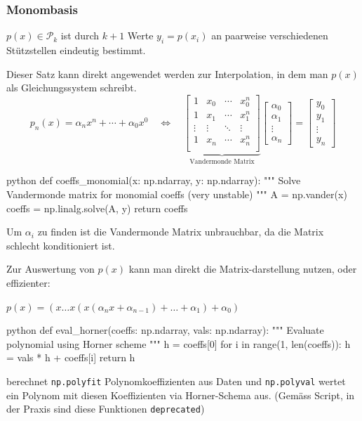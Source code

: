 \subsubsection{Monombasis}

 $p(x) \in \mathcal{P}_k$ ist durch $k+1$ Werte $y_i = p(x_i)$ an paarweise verschiedenen Stützstellen eindeutig bestimmt.

Dieser Satz kann direkt angewendet werden zur Interpolation, in dem man $p(x)$ als Gleichungssystem schreibt.
$$
	p_n(x) = \alpha_n x^n + \cdots + \alpha_0 x^0 \quad \iff \quad
	\underbrace{
		\begin{bmatrix}
			1      & x_0    & \cdots & x_0^n  \\
			1      & x_1    & \cdots & x_1^n  \\
			\vdots & \vdots & \ddots & \vdots \\
			1      & x_n    & \cdots & x_n^n  \\
		\end{bmatrix}
	}_\text{Vandermonde Matrix}
	\begin{bmatrix}
		\alpha_0 \\
		\alpha_1 \\
		\vdots   \\
		\alpha_n
	\end{bmatrix}
	=
	\begin{bmatrix}
		y_0    \\
		y_1    \\
		\vdots \\
		y_n
	\end{bmatrix}
$$

\begin{code}{python}
def coeffs_monomial(x: np.ndarray, y: np.ndarray):
    """ Solve Vandermonde matrix for monomial coeffs (very unstable) """
    A = np.vander(x)
    coeffs = np.linalg.solve(A, y)
    return coeffs
\end{code}

Um $\alpha_i$ zu finden ist die Vandermonde Matrix unbrauchbar, da die Matrix schlecht konditioniert ist.

\newpage

Zur Auswertung von $p(x)$ kann man direkt die Matrix-darstellung nutzen, oder effizienter:

 $p(x) = (x \ldots x ( x (\alpha_n x + \alpha_{n-1}) + \ldots + \alpha_1) + \alpha_0)$

\begin{code}{python}
def eval_horner(coeffs: np.ndarray, vals: np.ndarray):
    """ Evaluate polynomial using Horner scheme """
    h = coeffs[0]
    for i in range(1, len(coeffs)): h = vals * h + coeffs[i]
    return h
\end{code}

\innumpy berechnet \verb|np.polyfit| Polynomkoeffizienten aus Daten und \verb|np.polyval| wertet ein Polynom mit diesen Koeffizienten via Horner-Schema aus. (Gemäss Script, in der Praxis sind diese Funktionen \verb|deprecated|)
